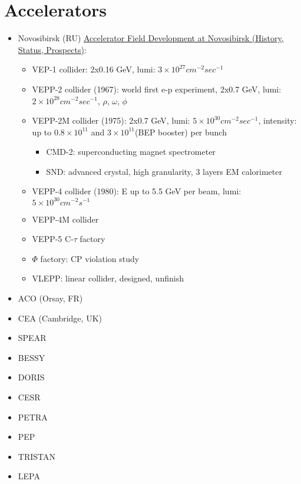 \section{Accelerators}
\begin{itemize}
    \item Novosibirsk (RU) \href{https://accelconf.web.cern.ch/p95/ARTICLES/MAD/MAD04.PDF}{Accelerator Field Development at Novosibirsk (History, Status, Prospects)}: 
	\begin{itemize}
	    \item VEP-1 collider: 2x0.16 GeV, lumi: $3 \times 10^{27} cm^{-2} sec^{-1}$
	    \item VEPP-2 collider (1967): world first e-p experiment, 2x0.7 GeV, lumi: $2\times 10^{28} cm^{-2} sec^{-1}$, $\rho$, $\omega$, $\phi$
	    \item VEPP-2M collider (1975): 2x0.7 GeV, lumi: $5\times 10^{30} cm^{-2}sec^{-1}$, intensity: up to $0.8 \times 10^{11}$ and $3\times10^{11}$(BEP booster) per bunch
		\begin{itemize}
		    \item CMD-2: superconducting magnet spectrometer
		    \item SND: advanced crystal, high granularity, 3 layers EM calorimeter
		\end{itemize}
	    \item VEPP-4 collider (1980): E up to 5.5 GeV per beam, lumi: $5\times10^{30} cm^{-2}s^{-1}$
	    \item VEPP-4M collider
	    \item VEPP-5 C-$\tau$ factory
	    \item $\Phi$ factory: CP violation study
	    \item VLEPP: linear collider, designed, unfinish
	\end{itemize}
    \item ACO (Orsay, FR)
    \item CEA (Cambridge, UK)
    \item SPEAR
    \item BESSY
    \item DORIS
    \item CESR
    \item PETRA
    \item PEP
    \item TRISTAN
    \item LEPA
\end{itemize}
